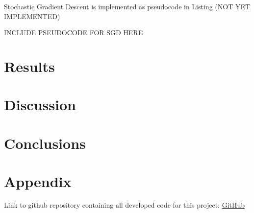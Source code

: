 \documentclass[11pt, a4paper]{article}
\begin{document}
Stochastic Gradient Descent is implemented as pseudocode in Listing (NOT YET IMPLEMENTED)

INCLUDE PSEUDOCODE FOR SGD HERE



\section*{Results}



\section*{Discussion}



\section*{Conclusions}



\section*{\label{sec:app}Appendix}
Link to github repository containing all developed code for this project: \href{https://github.com/AndreasBordvik/FYS-STK4155-Prj2_report}{GitHub}

\newpage
\newpage



\end{document}
